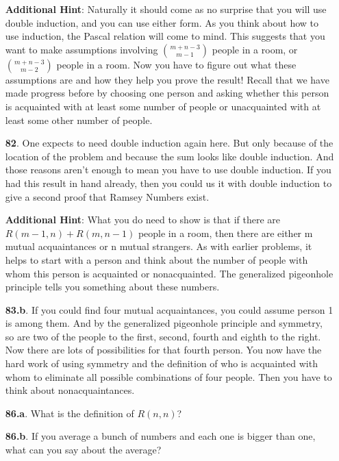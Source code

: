 \documentclass[10pt,]{book}
\theoremstyle{plain}
\theoremstyle{definition}
\theoremstyle{definition}
\numberwithin{equation}{chapter}
\begin{document}
\begin{itemize}[itemsep=1em]
\par\smallskip
\noindent\textbf{Additional Hint}: \hypertarget{p-500}{}%
Naturally it should come as no surprise that you will use double induction, and you can use either form. As you think about how to use induction, the Pascal relation will come to mind. This suggests that you want to make assumptions involving \(\binom{m+n-3}{m-1}\) people in a room, or \(\binom{m+n-3}{m-2}\) people in a room. Now you have to figure out what these assumptions are and how they help you prove the result! Recall that we have made progress before by choosing one person and asking whether this person is acquainted with at least some number of people or unacquainted with at least some other number of people.%

\item[\textbf{82}.]\hypertarget{p-503}{}%
One expects to need double induction again here. But only because of the location of the problem and because the sum looks like double induction. And those reasons aren't enough to mean you have to use double induction. If you had this result in hand already, then you could us it with double induction to give a second proof that Ramsey Numbers exist.%

\par\smallskip
\noindent\textbf{Additional Hint}: \hypertarget{p-504}{}%
What you do need to show is that if there are \(R(m - 1, n) + R(m, n - 1)\) people in a room, then there are either m mutual acquaintances or n mutual strangers. As with earlier problems, it helps to start with a person and think about the number of people with whom this person is acquainted or nonacquainted. The generalized pigeonhole principle tells you something about these numbers.%

\item[\textbf{83.b}.]\hypertarget{p-509}{}%
If you could find four mutual acquaintances, you could assume person 1 is among them. And by the generalized pigeonhole principle and symmetry, so are two of the people to the first, second, fourth and eighth to the right. Now there are lots of possibilities for that fourth person. You now have the hard work of using symmetry and the definition of who is acquainted with whom to eliminate all possible combinations of four people. Then you have to think about nonacquaintances.%

\item[\textbf{86.a}.]\hypertarget{p-520}{}%
What is the definition of \(R(n, n)\)?%

\item[\textbf{86.b}.]\hypertarget{p-523}{}%
If you average a bunch of numbers and each one is bigger than one, what can you say about the average?%


\end{itemize}
\end{document}
